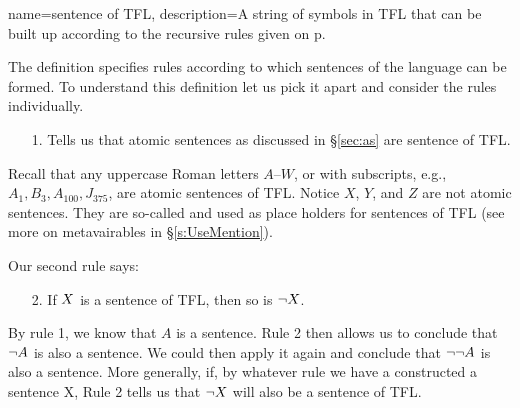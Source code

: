 
{
name=sentence of TFL,
description={A string of symbols in TFL that can be built up according to the recursive rules given on p.~\pageref{TFLsentences}}
}

The definition specifies rules according to which sentences of the language can be formed. To understand this definition let us pick it apart and consider the rules individually.



\begin{enumerate}
\item[1.] Tells us that atomic sentences as discussed in \S\ref{sec:as} are sentence of TFL.
\end{enumerate}
Recall that any uppercase Roman letters $A$--$W$, or with subscripts, e.g., $A_1, B_3, A_{100}, J_{375}$, are atomic sentences of TFL. Notice $X$, $Y$, and $Z$ are not atomic sentences. They are so-called  and used as place holders for sentences of TFL (see more on metavairables in \S\ref{s:UseMention}).



Our second rule says:
\begin{enumerate}
\item[2.]
If $X$ is a sentence of TFL, then so is $\neg X$.
\end{enumerate}
By rule 1, we know that $A$ is a sentence. Rule 2 then allows us to conclude that $\neg A$ is also a sentence. We could then apply it again and conclude that $\neg\neg A$ is also a sentence. More generally, if, by whatever rule we have a constructed a sentence X, Rule 2 tells us that $\neg X$ will also be a sentence of TFL.

